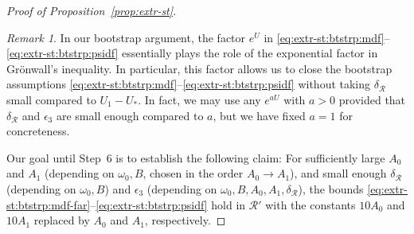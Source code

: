 \documentclass[10pt, reqno]{amsart}
\theoremstyle{definition}
\theoremstyle{remark}
\newtheorem{remark}[theorem]{Remark}
\theoremstyle{conjecture}
\numberwithin{equation}{section}
\newcommand{\0}{\emptyset}
\newcommand{\dlt}{\delta}
\newcommand{\eps}{\epsilon}
\newcommand{\omg}{\omega}
\newcommand{\calR}{\mathcal R}
\begin{document}
\begin{proof}[Proof of Proposition~\ref{prop:extr-st}]
\begin{remark} 
In our bootstrap argument, the factor $e^{U}$ in \eqref{eq:extr-st:btstrp:mdf}--\eqref{eq:extr-st:btstrp:psidf} essentially plays the role of the exponential factor in Gr\"onwall's inequality. In particular, this factor allows us to close the bootstrap assumptions \eqref{eq:extr-st:btstrp:mdf}--\eqref{eq:extr-st:btstrp:psidf} without taking $\dlt_{\calR}$ small compared to $U_{1} - U_{\ast}$. In fact, we may use any $e^{a U}$ with $a > 0$ provided that $\dlt_{\calR}$ and $\eps_{3}$ are small enough compared to $a$,  but we have fixed $a = 1$ for concreteness.
\end{remark}
Our goal until Step~6 is to establish the following claim: For sufficiently large $A_{0}$ and $A_{1}$ (depending on $\omg_0, B$, chosen in the order $A_{0} \to A_{1}$), and small enough $\dlt_{\calR}$ (depending on $\omg_0, B$) and $\eps_{3}$ (depending on $\omg_0, B, A_{0}, A_{1}, \dlt_{\calR}$), the bounds \eqref{eq:extr-st:btstrp:mdf-far}--\eqref{eq:extr-st:btstrp:psidf} hold in $\calR'$ with the constants $10 A_{0}$ and $10 A_{1}$ replaced by $A_{0}$ and $A_{1}$, respectively.



\end{proof}
\end{document}
